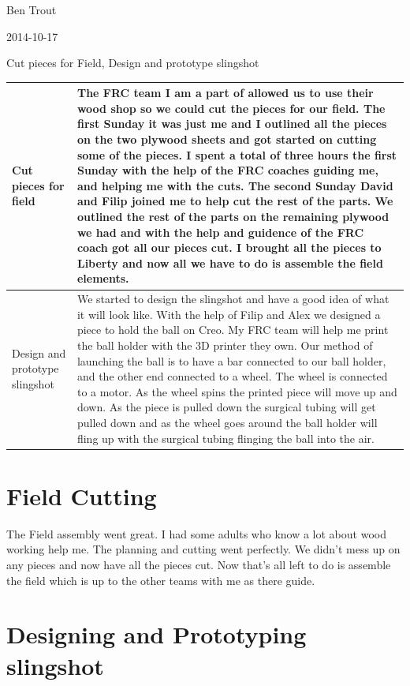Ben Trout

2014-10-17

Cut pieces for Field, Design and prototype slingshot

\begin{tabular}{|p{5cm}|p{5cm}|}
\hline
Cut pieces for field&
The FRC team I am a part of allowed us to use their wood shop so we could cut the pieces for our field. The first Sunday it was just me and I outlined all the pieces on the two plywood sheets and got started on cutting some of the pieces. I spent a total of three hours the first Sunday with the help of the FRC coaches guiding me, and helping me with the cuts. The second Sunday David and Filip joined me to help cut the rest of the parts. We outlined the rest of the parts on the remaining plywood we had and with the help and guidence of the FRC coach got all our pieces cut. I brought all the pieces to Liberty and now all we have to do is assemble the field elements.
\\
\hline
Design and prototype slingshot&
We started to design the slingshot and have a good idea of what it will look like. With the help of Filip and Alex we designed a piece to hold the ball on Creo. My FRC team will help me print the ball holder with the 3D printer they own. Our method of launching the ball is to have a bar connected to our ball holder, and the other end connected to a wheel. The wheel is connected to a motor. As the wheel spins the printed piece will move up and down. As the piece is pulled down the surgical tubing will get pulled down and as the wheel goes around the ball holder will fling up with the surgical tubing flinging the ball into the air.
\\
\hline
\end{tabular}

\section*{Field Cutting}

The Field assembly went great. I had some adults who know a lot about wood working help me. The planning and cutting went perfectly. We didn't mess up on any pieces and now have all the pieces cut. Now that's all left to do is assemble the field which is up to the other teams with me as there guide. 

\section*{Designing and Prototyping slingshot}


